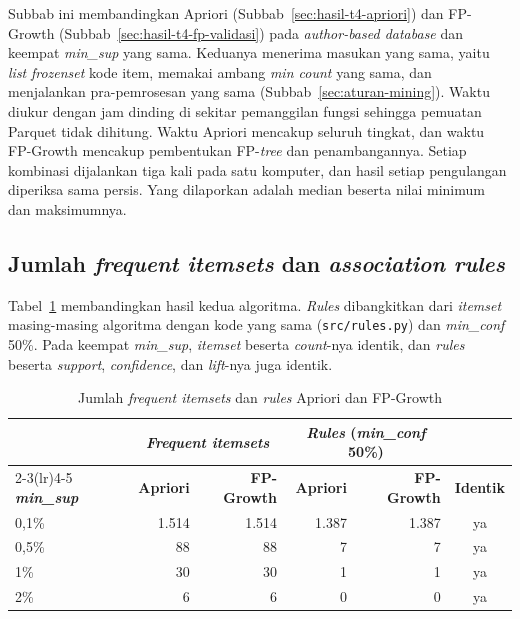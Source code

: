 Subbab ini membandingkan Apriori (Subbab~\ref{sec:hasil-t4-apriori}) dan FP-Growth (Subbab~\ref{sec:hasil-t4-fp-validasi}) pada \textit{author-based database} dan keempat \textit{min\_sup} yang sama. Keduanya menerima masukan yang sama, yaitu \textit{list} \textit{frozenset} kode item, memakai ambang \textit{min count} yang sama, dan menjalankan pra-pemrosesan yang sama (Subbab~\ref{sec:aturan-mining}). Waktu diukur dengan jam dinding di sekitar pemanggilan fungsi sehingga pemuatan Parquet tidak dihitung. Waktu Apriori mencakup seluruh tingkat, dan waktu FP-Growth mencakup pembentukan FP-\textit{tree} dan penambangannya. Setiap kombinasi dijalankan tiga kali pada satu komputer, dan hasil setiap pengulangan diperiksa sama persis. Yang dilaporkan adalah median beserta nilai minimum dan maksimumnya.

\subsection{Jumlah \textit{frequent itemsets} dan \textit{association rules}}
\label{sec:hasil-t6-jumlah}
Tabel~\ref{tab:t6-jumlah} membandingkan hasil kedua algoritma. \textit{Rules} dibangkitkan dari \textit{itemset} masing-masing algoritma dengan kode yang sama (\texttt{src/rules.py}) dan \textit{min\_conf} 50\%. Pada keempat \textit{min\_sup}, \textit{itemset} beserta \textit{count}-nya identik, dan \textit{rules} beserta \textit{support}, \textit{confidence}, dan \textit{lift}-nya juga identik.

\begin{table}[ht]
\caption{Jumlah \textit{frequent itemsets} dan \textit{rules} Apriori dan FP-Growth}
\label{tab:t6-jumlah}
\small
\begin{tabular}{@{}lrrrrc@{}}
\toprule
 & \multicolumn{2}{c}{\textbf{\textit{Frequent itemsets}}} & \multicolumn{2}{c}{\textbf{\textit{Rules} (\textit{min\_conf} 50\%)}} & \\
\cmidrule(lr){2-3}\cmidrule(lr){4-5}
\textbf{\textit{min\_sup}} & \textbf{Apriori} & \textbf{FP-Growth} & \textbf{Apriori} & \textbf{FP-Growth} & \textbf{Identik} \\
\midrule
0,1\% & 1.514 & 1.514 & 1.387 & 1.387 & ya \\
0,5\% & 88 & 88 & 7 & 7 & ya \\
1\% & 30 & 30 & 1 & 1 & ya \\
2\% & 6 & 6 & 0 & 0 & ya \\
\bottomrule
\end{tabular}
\end{table}


